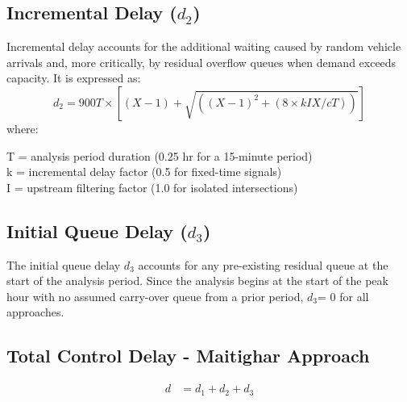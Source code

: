 \subsection{Incremental Delay ($d_2$)}

Incremental delay accounts for the additional waiting 
caused by random vehicle arrivals and, more critically, 
by residual overflow queues when demand exceeds capacity. 
It is expressed as:
\begin{equation}
    d_2 = 900T \times [(X - 1) + \sqrt{((X - 1)^2 + (8 \times kIX / cT))}]
\end{equation}
where:

T = analysis period duration (0.25 hr for a 15-minute period) \\
k = incremental delay factor (0.5 for fixed-time signals) \\
I = upstream filtering factor (1.0 for isolated intersections)



\subsection{Initial Queue Delay ($d_3$)}

The initial queue delay $d_3$ accounts for any pre-existing 
residual queue at the start of the analysis period. 
Since the analysis begins at the start of the peak hour 
with no assumed carry-over queue from a prior period, 
$d_3$= 0 for all approaches.

\subsection{Total Control Delay - Maitighar Approach}

\begin{align}
    d &= d_1 + d_2 + d_3
\end{align}

